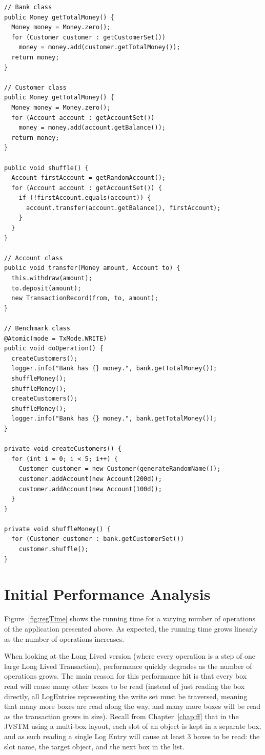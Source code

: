 \begin{lstlisting}[caption={Code for the Business Operation},
label={list:bank-code},float]
// Bank class
public Money getTotalMoney() {
  Money money = Money.zero();
  for (Customer customer : getCustomerSet())
    money = money.add(customer.getTotalMoney());
  return money;
}

// Customer class
public Money getTotalMoney() {
  Money money = Money.zero();
  for (Account account : getAccountSet())
    money = money.add(account.getBalance());
  return money;
}

public void shuffle() {
  Account firstAccount = getRandomAccount();
  for (Account account : getAccountSet()) {
    if (!firstAccount.equals(account)) {
      account.transfer(account.getBalance(), firstAccount);
    }
  }
}

// Account class
public void transfer(Money amount, Account to) {
  this.withdraw(amount);
  to.deposit(amount);
  new TransactionRecord(from, to, amount);
}

// Benchmark class
@Atomic(mode = TxMode.WRITE)
public void doOperation() {
  createCustomers();
  logger.info("Bank has {} money.", bank.getTotalMoney());
  shuffleMoney();
  shuffleMoney();
  createCustomers();
  shuffleMoney();
  logger.info("Bank has {} money.", bank.getTotalMoney());
}

private void createCustomers() {
  for (int i = 0; i < 5; i++) {
    Customer customer = new Customer(generateRandomName());
    customer.addAccount(new Account(200d));
    customer.addAccount(new Account(100d));
  }
}

private void shuffleMoney() {
  for (Customer customer : bank.getCustomerSet())
    customer.shuffle();
}
\end{lstlisting}


\section{Initial Performance Analysis}

Figure~\ref{fig:regTime} shows the running time for a varying number
of operations of the application presented above. As expected, the
running time grows linearly as the number of operations increases.

When looking at the Long Lived version (where every operation is a
step of one large Long Lived Transaction), performance quickly
degrades as the number of operations grows. The main reason for this
performance hit is that every box read will cause many other boxes to
be read (instead of just reading the box directly, all LogEntries
representing the write set must be traversed, meaning that many more
boxes are read along the way, and many more boxes will be read as the
transaction grows in size). Recall from Chapter~\ref{chap:ff} that in
the JVSTM using a multi-box layout, each slot of an object is kept in
a separate box, and as such reading a single Log Entry will cause at
least 3 boxes to be read: the slot name, the target object, and the
next box in the list.

